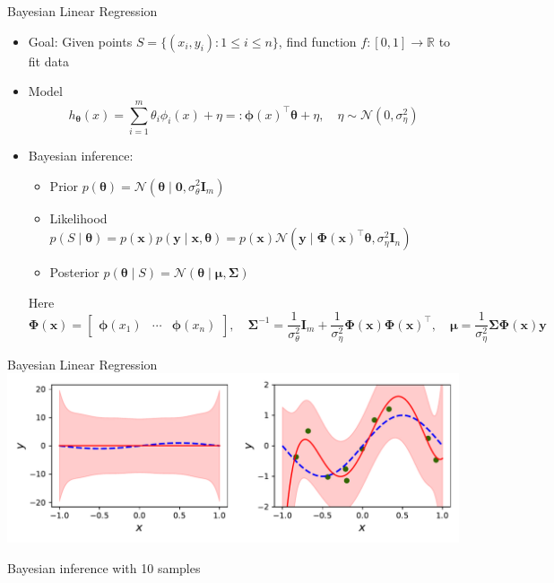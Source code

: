 \documentclass[aspectratio=169]{beamer}
\newcommand{\RR}{\mathbb{R}}
\begin{document}
\begin{frame}{Bayesian Linear Regression}
  \begin{itemize}
    \item
      Goal: Given points $S = \{(x_i, y_i) : 1 \leq i \leq n\}$, find function
      $f : [0, 1] \to \RR$ to fit data
    \item
      Model
      \begin{equation*}
        h_{\bm{\theta}}(x) = \sum_{i = 1}^m \theta_i \phi_i(x) + \eta =:
        \bm{\phi}(x)^\top \bm{\theta} + \eta, \quad \eta \sim \mathcal{N}(0,
        \sigma_\eta^2)
      \end{equation*}
    \item
      Bayesian inference:
      \begin{itemize}
        \item
          Prior $p(\bm{\theta}) = \mathcal{N}(\bm{\theta} \mid \bm{0},
          \sigma_\theta^2
          \mathbf{I}_m)$
        \item
          Likelihood $p(S \mid \bm{\theta}) = p(\bm{x}) p(\bm{y} \mid \bm{x},
          \bm{\theta}) = p(\bm{x}) \mathcal{N}(\bm{y} \mid
          \mathbf{\Phi}(\bm{x})^\top \bm{\theta}, \sigma_\eta^2 \mathbf{I}_n)$
        \item
          Posterior $p(\bm{\theta} \mid S) = \mathcal{N}(\bm{\theta} \mid
          \bm{\mu}, \mathbf{\Sigma})$
      \end{itemize}
      Here
      \begin{equation*}
        \mathbf{\Phi}(\bm{x}) =
        \begin{bmatrix}
          \bm{\phi}(x_1) & \cdots & \bm{\phi}(x_n)
        \end{bmatrix},
        \quad \mathbf{\Sigma}^{-1} = \frac{1}{\sigma_\theta^2} \mathbf{I}_m +
        \frac{1}{\sigma_\eta^2} \mathbf{\Phi}(\bm{x})
        \mathbf{\Phi}(\bm{x})^\top,
        \quad \bm{\mu} = \frac{1}{\sigma_\eta^2} \mathbf{\Sigma}
        \mathbf{\Phi}(\bm{x}) \bm{y}
      \end{equation*}
  \end{itemize}
\end{frame}

\begin{frame}{Bayesian Linear Regression}
  \centering
  \includegraphics[width=\textwidth]{../figures/bayesian_regression_1.pdf}

  Bayesian inference with 10 samples
\end{frame}
\end{document}
